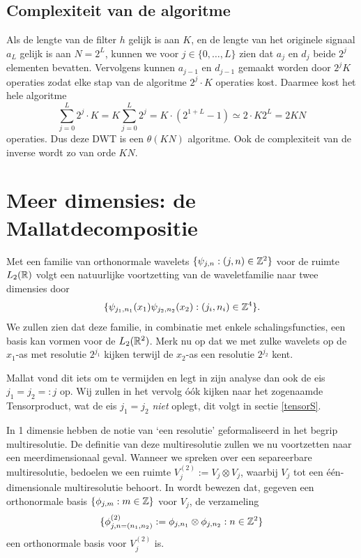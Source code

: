 \subsection{Complexiteit van de algoritme}
Als de lengte van de filter $h$ gelijk is aan $K$, en de lengte van het originele signaal $a_L$ 
gelijk is aan $N = 2^{L}$,
 kunnen we voor $j \in \{0, \ldots, L\}$ zien dat $a_j$ en $d_j$ beide $2^{j}$ elementen bevatten. 
Vervolgens kunnen $a_{j-1}$ en $d_{j-1}$ gemaakt worden door $2^{j}K$ operaties zodat elke stap van de algoritme 
$2^{j} \cdot K$ operaties kost. 
Daarmee kost het hele algoritme
\[
\sum_{j=0}^L 2^{j} \cdot K = K \sum_{j=0}^L 2^{j} = K \cdot (2^{1+L} - 1) \simeq 2 \cdot K 2^{L} = 2KN
\]
operaties. Dus deze DWT is een $\theta(KN)$ algoritme. 
Ook de complexiteit van de inverse wordt zo van orde $KN$.

\section{Meer dimensies: de Mallatdecompositie}
Met een familie van orthonormale wavelets $\{ \psi_{j,n}: (j,n) \in \mathbb{Z}^2\}$ voor de ruimte $L_2(\mathbb{R})$ volgt een natuurlijke voortzetting
van de waveletfamilie naar twee dimensies door
\[
\{ \psi_{j_1,n_1}(x_1) \psi_{j_2,n_2}(x_2): (j_i,n_i) \in \mathbb{Z}^4 \}.
\]
We zullen zien dat deze familie, in combinatie met enkele schalingsfuncties, een basis kan vormen voor de $L_2(\mathbb{R}^2)$.
Merk nu op dat we met zulke wavelets op de $x_1$-as met resolutie $2^{j_1}$ kijken 
terwijl de $x_2$-as een resolutie $2^{j_2}$ kent.

Mallat vond dit iets om te vermijden \cite[\S 7.7]{mallat} en legt in zijn analyse dan ook de eis $j_1 = j_2 =: j$ op. 
Wij zullen in het vervolg \'o\'ok kijken naar het zogenaamde Tensorproduct, wat de eis $j_1 = j_2$ \emph{niet} oplegt,
dit volgt in sectie \ref{tensorS}.

In 1 dimensie hebben de notie van `een resolutie' geformaliseerd in het begrip multiresolutie.
De definitie van deze multiresolutie zullen we nu voortzetten naar een meerdimensionaal geval. 
Wanneer we spreken over een separeerbare multiresolutie, bedoelen we een ruimte $V_j^{(2)} := V_j \otimes V_j$,
waarbij $V_j$ tot een \'e\'en-dimensionale multiresolutie behoort.
In \cite[A.5]{mallat} wordt bewezen dat, gegeven een orthonormale basis $\{ \phi_{j,m}: m \in \mathbb{Z} \}$ voor $V_j$, de verzameling
\begin{equation}
  \label{phi_phi_basis}
  \{ \phi^{(2)}_{j,n=(n_1,n_2)} := \phi_{j,n_1} \otimes \phi_{j,n_2}: n \in \mathbb{Z}^2 \}
\end{equation}
een orthonormale basis voor $V_j^{(2)}$ is.

